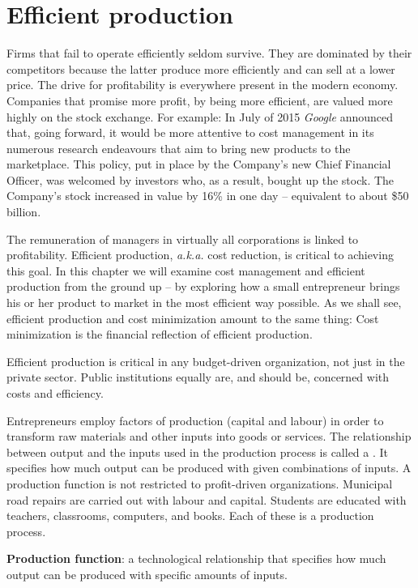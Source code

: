 \section{Efficient production}\label{sec:ch8sec1}

Firms that fail to operate efficiently seldom survive. They are dominated by
their competitors because the latter produce more efficiently and can sell
at a lower price. The drive for profitability is everywhere present in the
modern economy. Companies that promise more profit, by being more efficient,
are valued more highly on the stock exchange. For example: In July of 2015
\textit{Google} announced that, going forward, it would be more attentive to cost
management in its numerous research endeavours that aim to bring new
products to the marketplace. This policy, put in place by the Company's new
Chief Financial Officer, was welcomed by investors who, as a result, bought
up the stock. The Company's stock increased in value by 16\% in one day -- equivalent
to about \$50 billion.

The remuneration of managers in virtually all corporations is linked to
profitability. Efficient production, \textit{a.k.a.} cost reduction, is
critical to achieving this goal. In this chapter we will examine cost
management and efficient production from the ground up -- by exploring how a
small entrepreneur brings his or her product to market in the most efficient
way possible. As we shall see, efficient production and cost minimization
amount to the same thing: Cost minimization is the financial reflection of
efficient production.

Efficient production is critical in any budget-driven organization, not just
in the private sector. Public institutions equally are, and should be,
concerned with costs and efficiency.

Entrepreneurs employ factors of production (capital and labour) in order to
transform raw materials and other inputs into goods or services. The
relationship between output and the inputs used in the production process is
called a . It specifies how much output can
be produced with given combinations of inputs. A production function is not
restricted to profit-driven organizations. Municipal road repairs are
carried out with labour and capital. Students are educated with teachers,
classrooms, computers, and books. Each of these is a production process.

\begin{DefBox}
	\textbf{Production function}: a technological relationship that specifies how much output can be produced with specific amounts of inputs.
\end{DefBox}

